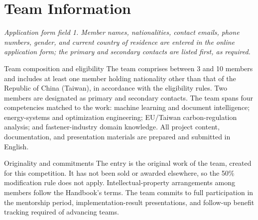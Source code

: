 \section{Team Information}\label{sec:team}

\emph{Application form field 1. Member names, nationalities, contact emails,
phone numbers, gender, and current country of residence are entered in the
online application form; the primary and secondary contacts are listed first,
as required.}

\begin{formfield}{Team composition and eligibility}
The team comprises between 3 and 10 members and includes at least one member
holding nationality other than that of the Republic of China (Taiwan), in
accordance with the eligibility rules\cite{handbook}. Two members are
designated as primary and secondary contacts. The team spans four
competencies matched to the work: machine learning and document intelligence;
energy-systems and optimization engineering; EU/Taiwan carbon-regulation
analysis; and fastener-industry domain knowledge. All project content,
documentation, and presentation materials are prepared and submitted in
English.
\end{formfield}

\begin{formfield}{Originality and commitments}
The entry is the original work of the team, created for this competition. It
has not been sold or awarded elsewhere, so the 50\% modification rule does not
apply. Intellectual-property arrangements among members follow the Handbook's
terms\cite{handbook}. The team commits to full participation in the mentorship
period, implementation-result presentations, and follow-up benefit tracking
required of advancing teams.
\end{formfield}
